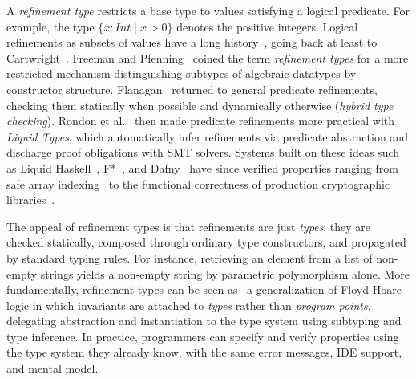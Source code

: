 \documentclass[acmsmall]{acmart}
\begin{document}
A \emph{refinement type} restricts a base type to values satisfying a logical predicate. For example, the type \(\{x\!:\!\mathit{Int} \mid x > 0\}\) denotes the positive integers. Logical refinements as subsets of values have a long history~\cite{jhala2021}, going back at least to Cartwright~\cite{cartwright1976}. Freeman and Pfenning~\cite{freeman1991} coined the term \emph{refinement types} for a more restricted mechanism distinguishing subtypes of algebraic datatypes by constructor structure. Flanagan~\cite{flanagan2006} returned to general predicate refinements, checking them statically when possible and dynamically otherwise (\emph{hybrid type checking}). Rondon et al.~\cite{rondon2008} then made predicate refinements more practical with \emph{Liquid Types}, which automatically infer refinements via predicate abstraction and discharge proof obligations with SMT solvers. Systems built on these ideas such as Liquid Haskell~\cite{vazou2014}, F*~\cite{swamy2016}, and Dafny~\cite{leino2010} have since verified properties ranging from safe array indexing~\cite{rondon2008} to the functional correctness of production cryptographic libraries~\cite{zinzindohoue2017}.

The appeal of refinement types is that refinements are just \emph{types}: they are checked statically, composed through ordinary type constructors, and propagated by standard typing rules. For instance, retrieving an element from a list of non-empty strings yields a non-empty string by parametric polymorphism alone. More fundamentally, refinement types can be seen as~\cite{jhala2019why} a generalization of Floyd-Hoare logic in which invariants are attached to \emph{types} rather than \emph{program points}, delegating abstraction and instantiation to the type system using subtyping and type inference. In practice, programmers can specify and verify properties using the type system they already know, with the same error messages, IDE support, and mental model.
\end{document}

